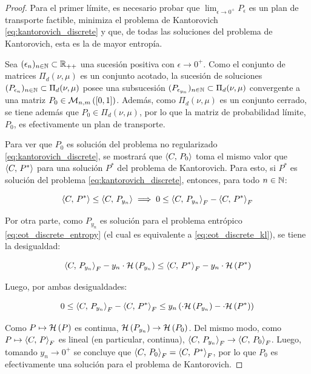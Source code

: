 \begin{proof}
	Para el primer límite, es necesario probar que $\lim_{\epsilon\to 0^+} P_\epsilon$ es un plan de transporte factible, minimiza el problema de Kantorovich \eqref{eq:kantorovich_discrete} y que, de todas las soluciones del problema de Kantorovich, esta es la de mayor entropía.

	Sea $(\epsilon_n)_{n\in\mathbb{N}}\subset\mathbb{R}_{++}$ una sucesión positiva con $\epsilon\to 0^+$. Como el conjunto de matrices $\Pi_d(\nu,\mu)$ es un conjunto acotado, la sucesión de soluciones $(P_{\epsilon_n})_{n\in\mathbb{N}}\subset\Pi_d(\nu,\mu)$ posee una subsucesión $(P_{\epsilon_{y_n}})_{n\in\mathbb{N}}\subset\Pi_d(\nu,\mu)$ convergente a una matriz $P_0\in\mathcal{M}_{n,m}\left([0,1]\right)$. Además, como $\Pi_d(\nu,\mu)$ es un conjunto cerrado, se tiene además que $P_0\in\Pi_d(\nu,\mu)$, por lo que la matriz de probabilidad límite, $P_0$, es efectivamente un plan de transporte.

	Para ver que $P_0$ es solución del problema no regularizado \eqref{eq:kantorovich_discrete}, se mostrará que $\left\langle C,\,P_0\right\rangle$ toma el mismo valor que $\left\langle C,\,P^*\right\rangle$ para una solución $P^*$ del problema de Kantorovich. Para esto, si $P^*$ es solución del problema \eqref{eq:kantorovich_discrete}, entonces, para todo $n\in\mathbb{N}$:

	\begin{equation}
		\left\langle C,\,P^*\right\rangle \leq \left\langle C,\,P_{y_n}\right\rangle
		\implies
		0 \leq \left\langle C,\,P_{y_n}\right\rangle_F - \left\langle C,\,P^*\right\rangle_F
	\end{equation}

	Por otra parte, como $P_{y_n}$ es solución para el problema entrópico \eqref{eq:eot_discrete_entropy} (el cual es equivalente a \eqref{eq:eot_discrete_kl}), se tiene la desigualdad:

	\begin{equation}
		\left\langle C,\,P_{y_n}\right\rangle_F - y_n\cdot\mathcal{H}\left(P_{y_n}\right)
		\leq \left\langle C,\,P^*\right\rangle_F - y_n\cdot\mathcal{H}\left(P^*\right)
	\end{equation}

	Luego, por ambas desigualdades:

	\begin{equation}
		\label{eq:eot_convergence_proof}
		0 \leq \left\langle C,\,P_{y_n}\right\rangle_F - \left\langle C,\,P^*\right\rangle_F
		\leq y_n\left(\cdot\mathcal{H}\left(P_{y_n}\right) - \cdot\mathcal{H}\left(P^*\right)\right)
	\end{equation}

	Como $P\mapsto\mathcal{H}\left(P\right)$ es continua, $\mathcal{H}\left(P_{y_n}\right) \to \mathcal{H}\left(P_0\right)$. Del mismo modo, como $P\mapsto\left\langle C,\,P\right\rangle_F$ es lineal (en particular, continua), $\left\langle C,\,P_{y_n}\right\rangle_F\to\left\langle C,\,P_0\right\rangle_F$. Luego, tomando $y_n\to 0^+$ se concluye que $\left\langle C,\,P_0\right\rangle_F = \left\langle C,\,P^*\right\rangle_F$, por lo que $P_0$ es efectivamente una solución para el problema de Kantorovich.


\end{proof}
